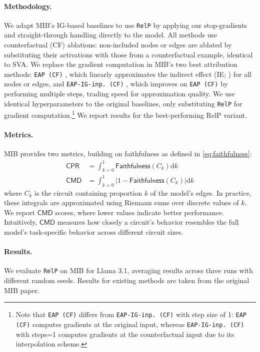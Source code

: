 \documentclass{article}
\theoremstyle{plain}
\theoremstyle{definition}
\theoremstyle{remark}
\begin{document}
\paragraph{Methodology.} We adapt MIB's IG-based baselines to use \texttt{RelP} by applying our stop-gradients and straight-through handling directly to the model. All methods use counterfactual (CF) ablations: non-included nodes or edges are ablated by substituting their activations with those from a counterfactual example, identical to SVA. We replace the gradient computation in MIB's two best attribution methods: \texttt{EAP (CF)} \citep{nanda2023patching,syed2024attribution}, which linearly approximates the indirect effect (IE; \citealp{pearl2001ie}) for all nodes or edges, and \texttt{EAP-IG-inp. (CF)} \citep{hanna2024faith}, which improves on \texttt{EAP (CF)} by performing multiple steps, trading speed for approximation quality. We use identical hyperparameters to the original baselines, only substituting \texttt{RelP} for gradient computation.\footnote{Note that \texttt{EAP (CF)} differs from \texttt{EAP-IG-inp. (CF)} with step size of 1: \texttt{EAP (CF)} computes gradients at the original input, whereas \texttt{EAP-IG-inp. (CF)} with steps=1 computes gradients at the counterfactual input due to its interpolation scheme.} We report results for the best-performing RelP variant.

\paragraph{Metrics.} MIB provides two metrics, building on faithfulness as defined in \cref{eq:faithfulness}:
\begin{align}
\mathsf{CPR} &= \int_{k=0}^{1} \mathsf{Faithfulness}(C_k) \mathrm{d}k \\
\mathsf{CMD} &= \int_{k=0}^{1} \lvert 1 - \mathsf{Faithfulness}(C_k) \rvert \mathrm{d}k
\end{align}
where $C_k$ is the circuit containing proportion $k$ of the model's edges. In practice, these integrals are approximated using Riemann sums over discrete values of $k$. We report $\mathsf{CMD}$ scores, where lower values indicate better performance. Intuitively, $\mathsf{CMD}$ measures how closely a circuit's behavior resembles the full model's task-specific behavior across different circuit sizes.

\paragraph{Results.} We evaluate \texttt{RelP} on MIB for Llama 3.1, averaging results across three runs with different random seeds. Results for existing methods are taken from the original MIB paper.
\end{document}
